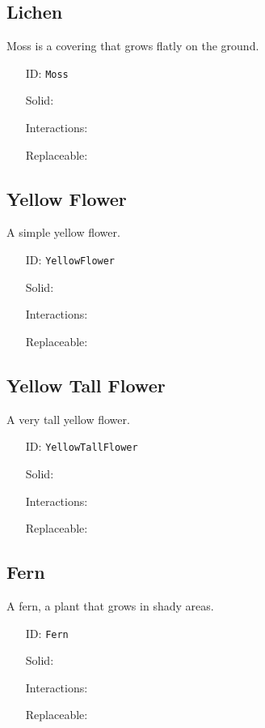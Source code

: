 \subsection{Lichen}\label{subsec:blocks_lichen}
Moss is a covering that grows flatly on the ground.
\newline
\begin{itemize}[nosep]
\item[ID:] \texttt{Moss}
\item[Solid:]  \Checkmark \item[Interactions:]  \XSolidBrush \item[Replaceable:]  \Checkmark \end{itemize}

\subsection{Yellow Flower}\label{subsec:blocks_yellow flower}
A simple yellow flower.
\newline
\begin{itemize}[nosep]
\item[ID:] \texttt{YellowFlower}
\item[Solid:]  \XSolidBrush \item[Interactions:]  \XSolidBrush \item[Replaceable:]  \Checkmark \end{itemize}

\subsection{Yellow Tall Flower}\label{subsec:blocks_yellow tall flower}
A very tall yellow flower.
\newline
\begin{itemize}[nosep]
\item[ID:] \texttt{YellowTallFlower}
\item[Solid:]  \XSolidBrush \item[Interactions:]  \XSolidBrush \item[Replaceable:]  \XSolidBrush \end{itemize}

\subsection{Fern}\label{subsec:blocks_fern}
A fern, a plant that grows in shady areas.
\newline
\begin{itemize}[nosep]
\item[ID:] \texttt{Fern}
\item[Solid:]  \XSolidBrush \item[Interactions:]  \XSolidBrush \item[Replaceable:]  \Checkmark \end{itemize}

